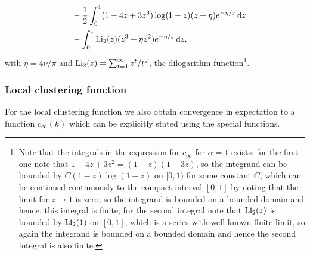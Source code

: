 \begin{theorem}
\begin{align*}
	&\hspace{10pt}- \frac{1}{2} \int_0^1 (1 - 4z + 3z^3)\log(1-z)(z + \eta)e^{-\eta/z} \operatorname{\mathrm{d}\hspace{-2pt}} z\\
	&\hspace{10pt}- \int_0^1 \operatorname{Li}_2(z)(z^3 + \eta z^2) e^{-\eta/z} \operatorname{\mathrm{d}\hspace{-2pt}} z,		
\end{align*}
with $\eta = 4\nu/\pi$ and $\operatorname{Li}_2(z) = \sum_{t = 1}^\infty z^t/t^2$, the dilogarithm function\footnote{Note that the integrals in the expression for $c_\infty$ for $\alpha = 1$ exists: for the first one note that $1-4z+3z^2=(1-z)(1-3z)$, so the integrand can be bounded by $C(1-z)\log(1-z)$ on $[0,1)$ for some constant $C$, which can be continued continuously to the compact interval $[0,1]$ by noting that the limit for $z \rightarrow 1$ is zero, so the integrand is bounded on a bounded domain and hence, this integral is finite; for the second integral note that $\operatorname{Li}_2(z)$ is bounded by $\operatorname{Li}_2(1)$ on $[0,1]$, which is a series with well-known finite limit, so again the integrand is bounded on a bounded domain and hence the second integral is also finite.}.
\end{theorem}

\subsubsection{Local clustering function}

For the local clustering function we also obtain convergence in expectation to a function $c_\infty(k)$ which can be explicitly stated using the special functions.


